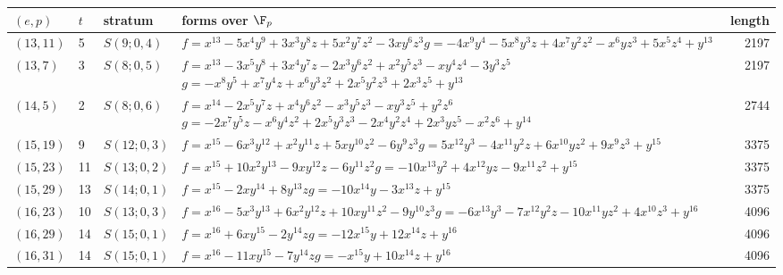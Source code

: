 \begin{tabular}{@{}lll>{\raggedright\arraybackslash}p{9.6cm}r@{}}
\toprule
$(e,p)$ & $t$ & stratum & forms over $\F_p$ & length\\
\midrule
$(13,11)$ & 5 & $S(9;0,4)$ & $f=x^{13} - 5x^{4}y^{9} + 3x^{3}y^{8}z + 5x^{2}y^{7}z^{2} - 3xy^{6}z^{3}$\newline $g=-4x^{9}y^{4} - 5x^{8}y^{3}z + 4x^{7}y^{2}z^{2} - x^{6}yz^{3} + 5x^{5}z^{4} + y^{13}$ & 2197\\
$(13,7)$ & 3 & $S(8;0,5)$ & $f=x^{13} - 3x^{5}y^{8} + 3x^{4}y^{7}z - 2x^{3}y^{6}z^{2} + x^{2}y^{5}z^{3} - xy^{4}z^{4} - 3y^{3}z^{5}$\newline $g=-x^{8}y^{5} + x^{7}y^{4}z + x^{6}y^{3}z^{2} + 2x^{5}y^{2}z^{3} + 2x^{3}z^{5} + y^{13}$ & 2197\\
$(14,5)$ & 2 & $S(8;0,6)$ & $f=x^{14} - 2x^{5}y^{7}z + x^{4}y^{6}z^{2} - x^{3}y^{5}z^{3} - xy^{3}z^{5} + y^{2}z^{6}$\newline $g=-2x^{7}y^{5}z - x^{6}y^{4}z^{2} + 2x^{5}y^{3}z^{3} - 2x^{4}y^{2}z^{4} + 2x^{3}yz^{5} - x^{2}z^{6} + y^{14}$ & 2744\\
$(15,19)$ & 9 & $S(12;0,3)$ & $f=x^{15} - 6x^{3}y^{12} + x^{2}y^{11}z + 5xy^{10}z^{2} - 6y^{9}z^{3}$\newline $g=5x^{12}y^{3} - 4x^{11}y^{2}z + 6x^{10}yz^{2} + 9x^{9}z^{3} + y^{15}$ & 3375\\
$(15,23)$ & 11 & $S(13;0,2)$ & $f=x^{15} + 10x^{2}y^{13} - 9xy^{12}z - 6y^{11}z^{2}$\newline $g=-10x^{13}y^{2} + 4x^{12}yz - 9x^{11}z^{2} + y^{15}$ & 3375\\
$(15,29)$ & 13 & $S(14;0,1)$ & $f=x^{15} - 2xy^{14} + 8y^{13}z$\newline $g=-10x^{14}y - 3x^{13}z + y^{15}$ & 3375\\
$(16,23)$ & 10 & $S(13;0,3)$ & $f=x^{16} - 5x^{3}y^{13} + 6x^{2}y^{12}z + 10xy^{11}z^{2} - 9y^{10}z^{3}$\newline $g=-6x^{13}y^{3} - 7x^{12}y^{2}z - 10x^{11}yz^{2} + 4x^{10}z^{3} + y^{16}$ & 4096\\
$(16,29)$ & 14 & $S(15;0,1)$ & $f=x^{16} + 6xy^{15} - 2y^{14}z$\newline $g=-12x^{15}y + 12x^{14}z + y^{16}$ & 4096\\
$(16,31)$ & 14 & $S(15;0,1)$ & $f=x^{16} - 11xy^{15} - 7y^{14}z$\newline $g=-x^{15}y + 10x^{14}z + y^{16}$ & 4096\\
\bottomrule
\end{tabular}
